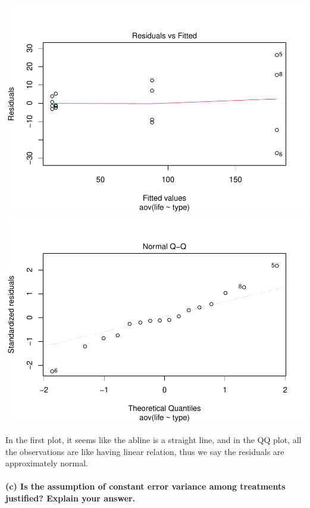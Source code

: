 \documentclass[
]{article}
\begin{document}
\includegraphics{HW7_XiangyuRen_files/figure-latex/unnamed-chunk-3-1.pdf}
\includegraphics{HW7_XiangyuRen_files/figure-latex/unnamed-chunk-3-2.pdf}

In the first plot, it seems like the abline is a straight line, and in
the QQ plot, all the observations are like having linear relation, thus
we say the residuals are approximately normal.

\hypertarget{c-is-the-assumption-of-constant-error-variance-among-treatments-justified-explain-your-answer.}{%
\paragraph{(c) Is the assumption of constant error variance among
treatments justified? Explain your
answer.}\label{c-is-the-assumption-of-constant-error-variance-among-treatments-justified-explain-your-answer.}}
\end{document}

